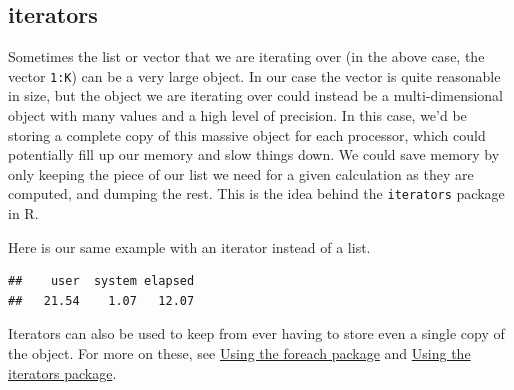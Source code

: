 \documentclass[]{article}
\newenvironment{Shaded}{\begin{snugshade}}{\end{snugshade}}
\newcommand{\KeywordTok}[1]{\textcolor[rgb]{0.13,0.29,0.53}{\textbf{{#1}}}}
\newcommand{\DataTypeTok}[1]{\textcolor[rgb]{0.13,0.29,0.53}{{#1}}}
\newcommand{\DecValTok}[1]{\textcolor[rgb]{0.00,0.00,0.81}{{#1}}}
\newcommand{\StringTok}[1]{\textcolor[rgb]{0.31,0.60,0.02}{{#1}}}
\newcommand{\OtherTok}[1]{\textcolor[rgb]{0.56,0.35,0.01}{{#1}}}
\newcommand{\NormalTok}[1]{{#1}}
\begin{document}
\subsection{iterators}\label{iterators}

Sometimes the list or vector that we are iterating over (in the above
case, the vector \texttt{1:K}) can be a very large object. In our case
the vector is quite reasonable in size, but the object we are iterating
over could instead be a multi-dimensional object with many values and a
high level of precision. In this case, we'd be storing a complete copy
of this massive object for each processor, which could potentially fill
up our memory and slow things down. We could save memory by only keeping
the piece of our list we need for a given calculation as they are
computed, and dumping the rest. This is the idea behind the
\texttt{iterators} package in R.

Here is our same example with an iterator instead of a list.

\begin{Shaded}
\end{Shaded}

\begin{verbatim}
##    user  system elapsed 
##   21.54    1.07   12.07
\end{verbatim}

Iterators can also be used to keep from ever having to store even a
single copy of the object. For more on these, see
\href{http://cran.r-project.org/web/packages/foreach/vignettes/foreach.pdf}{Using
the foreach package} and
\href{http://cran.r-project.org/web/packages/iterators/vignettes/iterators.pdf}{Using
the iterators package}.
\end{document}
